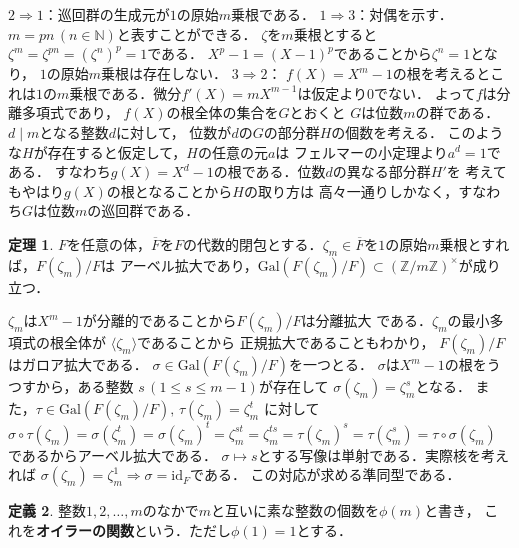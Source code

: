 \documentclass[dvipdfmx,a4paper,12pt]{jsarticle}
\makeatletter
\theoremstyle{definition}
\newtheorem{theorem}{定理}[section]
\newtheorem{definition}[theorem]{定義}
\renewcommand{\proofname}{証明}
\renewenvironment{proof}[1][\proofname]{%
  \par\pushQED{\qed}%
  \normalfont \topsep6\p@\@plus6\p@\relax
  \trivlist
  \item[\hskip\labelsep\bfseries#1\@addpunct{.}]\ignorespaces
}{%
  \popQED\endtrivlist\@endpefalse
}
\makeatother
\begin{document}
\begin{proof}
    $2\Rightarrow 1$：巡回群の生成元が$1$の原始$m$乗根である．
    $1\Rightarrow 3$：対偶を示す．$m=pn\, (n\in \mathbb{N})$と表すことができる．
    $\zeta$を$m$乗根とすると$\zeta^m=\zeta^{pn}=(\zeta^n)^p=1$である．
    $X^p-1=(X-1)^p$であることから$\zeta^n=1$となり，
    $1$の原始$m$乗根は存在しない．
    $3\Rightarrow 2$：
    $f(X)=X^m-1$の根を考えるとこれは$1$の$m$乗根である．微分$f'(X)=mX^{m-1}$は仮定より$0$でない．
    よって$f$は分離多項式であり，
    $f(X)$の根全体の集合を$G$とおくと
    $G$は位数$m$の群である．$d\mid m$となる整数$d$に対して，
    位数が$d$の$G$の部分群$H$の個数を考える．
    このような$H$が存在すると仮定して，$H$の任意の元$a$は
    フェルマーの小定理より$a^d=1$である．
    すなわち$g(X)=X^d-1$の根である．位数$d$の異なる部分群$H'$を
    考えてもやはり$g(X)$の根となることから$H$の取り方は
    高々一通りしかなく，すなわち$G$は位数$m$の巡回群である．
\end{proof}

\begin{theorem}
    $F$を任意の体，$\overline{F}$を$F$の代数的閉包とする．$\zeta_m\in 
    \overline{F}$を$1$の原始$m$乗根とすれば，$F(\zeta_m)/F$は
    アーベル拡大であり，$\mathrm{Gal}(F(\zeta_m)/F)\subset 
    (\mathbb{Z}/m\mathbb{Z})^\times$が成り立つ．
\end{theorem}

\begin{proof}
    $\zeta_m$は$X^m-1$が分離的であることから$F(\zeta_m)/F$は分離拡大
    である．$\zeta_m$の最小多項式の根全体が
    $\langle\zeta_m\rangle$であることから
    正規拡大であることもわかり，
    $F(\zeta_m)/F$はガロア拡大である．
    $\sigma \in \mathrm{Gal}(F(\zeta_m)/F)$を一つとる．
    $\sigma$は$X^m-1$の根をうつすから，ある整数
    $s\, (1\leq s \leq m-1)$が存在して
    $\sigma(\zeta_m)=\zeta_m^s$となる．
    また，$\tau \in \mathrm{Gal}(F(\zeta_m)/F),\, \tau(\zeta_m)=\zeta_m^t$
    に対して
    $\sigma\circ\tau (\zeta_m)=\sigma(\zeta_m^t)
    =\sigma(\zeta_m)^t=\zeta_m^{st}=\zeta_m^{ts}
    =\tau(\zeta_m)^s=\tau(\zeta_m^s)=\tau\circ\sigma (\zeta_m)$
    であるからアーベル拡大である．
    $\sigma \mapsto s$とする写像は単射である．実際核を考えれば
    $\sigma(\zeta_m)=\zeta_m^1\Rightarrow \sigma=\mathrm{id}_F$である．
    この対応が求める準同型である．
\end{proof}

\begin{definition}

    整数$1,2,\ldots,m$のなかで$m$と互いに素な整数の個数を$\phi (m)$と書き，
    これを\textbf{オイラーの関数}という．ただし$\phi (1)=1$とする．
\end{definition}
\end{document}
